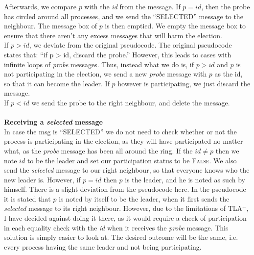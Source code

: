 \documentclass{report}
\begin{document}
Afterwards, we compare $p$ with the \textit{id} from the message.
If $p = id$, then the probe has circled around all processes, and we send the ``SELECTED'' message to the neighbour. The message box of $p$ is then emptied. We empty the message box to ensure that there aren't any excess messages that will harm the election.\\
If $p > id$, we deviate from the original pseudocode. The original pseudocode states that: ``if p > id, discard the probe.'' However, this leads to cases with infinite loops of \textit{probe} messages. Thus, instead what we do is, if $p > id$ and $p$ is not participating in the election, we send a new \textit{probe} message with $p$ as the id, so that it can become the leader. If $p$ however is participating, we just discard the message.\\
If $p < id$ we send the probe to the right  neighbour, and delete the message.
\\\\
\noindent
\textbf{Receiving a \textit{selected} message}\\
\noindent
In case the msg is ``SELECTED'' we do not need to check whether or not the process is participating in the election, as they will have participated no matter what, as the \textit{probe} message has been all around the ring. If the $id \neq p$ then we note $id$ to be the leader and set our participation status to be \textsc{False}. We also send the \textit{selected} message to our right neighbour, so that everyone knows who the new leader is. However, if $p = id$ then $p$ is the leader, and he is noted as such by himself. There is a slight deviation from the pseudocode here. In the pseudocode it is stated that $p$ is noted by itself to be the leader, when it first sends the \textit{selected} message to its right neighbour. However, due to the limitations of TLA$^{+}$, I have decided against doing it there, as it would require a check of participation in each equality check with the \textit{id} when it receives the \textit{probe} message. This solution is simply easier to look at. The desired outcome will be the same, i.e. every process having the same leader and not being participating.
\end{document}
